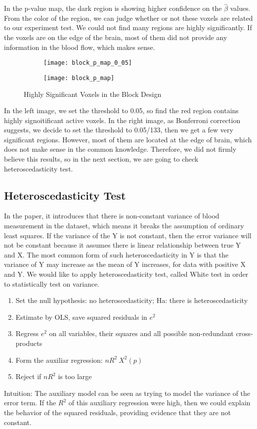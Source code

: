 In the p-value map, the dark region is showing higher confidence on the 
$\hat{\beta}$ values. From the color of the region, we can judge whether or 
not these voxels are related to our experiment test. We could not 
find many regions are highly significantly. If the voxels are on the 
edge of the brain, most of them did not provide any information in the blood flow, 
which makes sense. 

\begin{figure}[!h]
\centering
\begin{subfigure}{.46\textwidth}
  \texttt{[image: block\_p\_map\_0\_05]}
  \centering
\end{subfigure}%
\begin{subfigure}{.44\textwidth}
  \texttt{[image: block\_p\_map]}
  \centering
\end{subfigure}
\caption{Highly Significant Voxels in the Block Design\label{fig:hsVoxels}}
\end{figure}

In the left image, we set the threshold to 0.05, so find the red region contains
highly signoitificant active voxels. In the right image, as Bonferroni correction 
suggests, we decide to set the threshold to 0.05/133, then we get a few very 
significant regions. However, most of them are located at the edge of brain, 
which does not make sense in the common knowledge. Therefore, we did not 
firmly believe this results, so in the next section, we are going to check 
heteroscedasticity test.

\subsection{Heteroscedasticity Test}

In the paper, it introduces that there is non-constant variance of blood 
measurement in the dataset, which means it breaks the assumption of ordinary 
least squares. If the variance of the Y is not constant, then the error variance
will not be constant because it assumes there is linear relationship between 
true Y and X. The most common form of such heteroscedasticity in Y is that the 
variance of Y may increase as the mean of Y increases, for data with positive X
and Y. We would like to apply heteroscedasticity test, called White test in order to 
statistically test on variance.

\begin{enumerate}
\item Set the null hypothesis: no heteroscedasticity; Ha: there is heteroscedasticity
\item Estimate by OLS, save squared residuals in $e^2$
\item Regress $e^2$ on all variables, their squares and all possible non-redundant cross-products
\item Form the auxiliar regression: $n R^2 ~ X^2(p)$
\item Reject if $n R^2$ is too large
\end{enumerate}
Intuition: The auxiliary model can be seen as trying to model the variance of 
the error term. If the $R^2$ of this auxiliary regression were high, then we could
explain the behavior of the squared residuals, providing evidence that they are
not constant.

